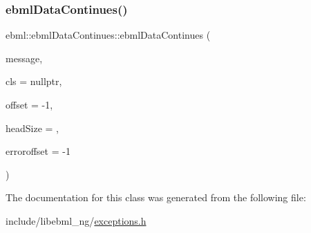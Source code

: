 \subsubsection{\texorpdfstring{ebml\+Data\+Continues()}{ebmlDataContinues()}}
{\footnotesize\ttfamily ebml\+::ebml\+Data\+Continues\+::ebml\+Data\+Continues (\begin{DoxyParamCaption}\item[{const std\+::string \&}]{message,  }\item[{const \mbox{\hyperlink{classebml_1_1ebmlElementClass}{ebml\+Element\+Class}} $\ast$}]{cls = {\ttfamily nullptr},  }\item[{off\+\_\+t}]{offset = {\ttfamily -\/1},  }\item[{unsigned char}]{head\+Size = {},  }\item[{off\+\_\+t}]{erroroffset = {\ttfamily -\/1} }\end{DoxyParamCaption})}



The documentation for this class was generated from the following file\+:\begin{DoxyCompactItemize}
\item 
include/libebml\+\_\+ng/\mbox{\hyperlink{exceptions_8h}{exceptions.\+h}}\end{DoxyCompactItemize}
